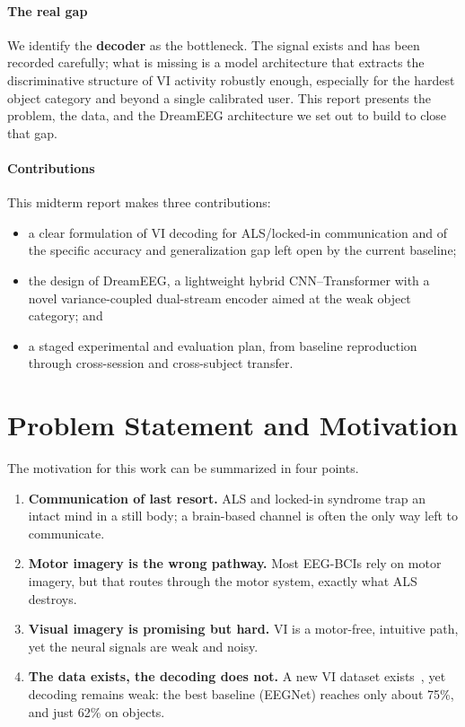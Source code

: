 \documentclass[conference]{IEEEtran}
\begin{document}
\paragraph*{The real gap} We identify the \textbf{decoder} as the bottleneck.
The signal exists and has been recorded carefully; what is missing is a model
architecture that extracts the discriminative structure of VI activity
robustly enough, especially for the hardest object category and beyond a
single calibrated user. This report presents the problem, the data, and the
DreamEEG architecture we set out to build to close that gap.

\paragraph*{Contributions} This midterm report makes three contributions:
\begin{itemize}
  \item a clear formulation of VI decoding for ALS/locked-in communication
        and of the specific accuracy and generalization gap left open by the
        current baseline;
  \item the design of DreamEEG, a lightweight hybrid CNN--Transformer with a
        novel variance-coupled dual-stream encoder aimed at the weak
        object category; and
  \item a staged experimental and evaluation plan, from baseline
        reproduction through cross-session and cross-subject transfer.
\end{itemize}

\section{Problem Statement and Motivation}
The motivation for this work can be summarized in four points.

\begin{enumerate}
  \item \textbf{Communication of last resort.} ALS and locked-in syndrome
        trap an intact mind in a still body; a brain-based channel is often
        the only way left to communicate.
  \item \textbf{Motor imagery is the wrong pathway.} Most EEG-BCIs rely on
        motor imagery, but that routes through the motor system, exactly
        what ALS destroys.
  \item \textbf{Visual imagery is promising but hard.} VI is a motor-free,
        intuitive path, yet the neural signals are weak and noisy.
  \item \textbf{The data exists, the decoding does not.} A new VI dataset
        exists~\cite{gao2026}, yet decoding remains weak: the best baseline
        (EEGNet) reaches only about 75\%, and just 62\% on objects.
\end{enumerate}
\end{document}
